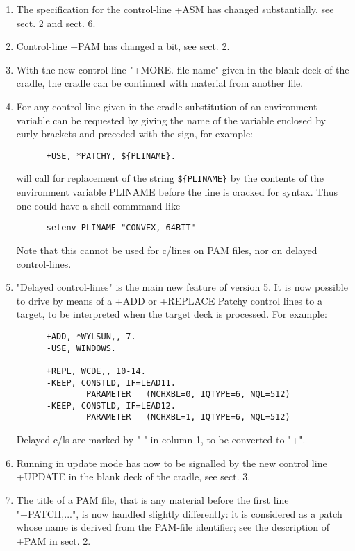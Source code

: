 \begin{enumerate}
\item
The specification for the control-line +ASM has changed substantially,
see sect. 2 and sect. 6.

\item
Control-line +PAM has changed a bit, see sect. 2.

\item
With the new control-line "+MORE. file-name" given in the blank deck
of the cradle, the cradle can be continued with material from another file.

\item
For any control-line given in the cradle substitution of an
environment variable can be requested by giving the name of the
variable enclosed by curly brackets and preceded with the \Lit{$} sign,
for example:
\begin{verbatim}
      +USE, *PATCHY, ${PLINAME}.
\end{verbatim}
will call for replacement of the string \verb!${PLINAME}! by the contents of
the environment variable PLINAME before the line is cracked for syntax.
Thus one could have a shell commmand like
\begin{verbatim}
      setenv PLINAME "CONVEX, 64BIT"
\end{verbatim}
Note that this cannot be used for c/lines on PAM files, nor on
delayed control-lines.

\item
"Delayed control-lines" is the main new feature of version 5.
It is now possible to drive by means of a +ADD or +REPLACE Patchy control
lines to a target, to be interpreted when the target deck is processed.
For example:
\begin{verbatim}
      +ADD, *WYLSUN,, 7.
      -USE, WINDOWS.

      +REPL, WCDE,, 10-14.
      -KEEP, CONSTLD, IF=LEAD11.
              PARAMETER   (NCHXBL=0, IQTYPE=6, NQL=512)
      -KEEP, CONSTLD, IF=LEAD12.
              PARAMETER   (NCHXBL=1, IQTYPE=6, NQL=512)
\end{verbatim}
Delayed c/ls are marked by "-" in column 1, to be converted to "+".

\item
Running in update mode has now to be signalled by the new control
line +UPDATE in the blank deck of the cradle, see sect. 3.

\item
The title of a PAM file, that is any material before the first
line "+PATCH,...", is now handled slightly differently: it is considered
as a patch whose name is derived from the PAM-file identifier;
see the description of +PAM in sect. 2.


\end{enumerate}

